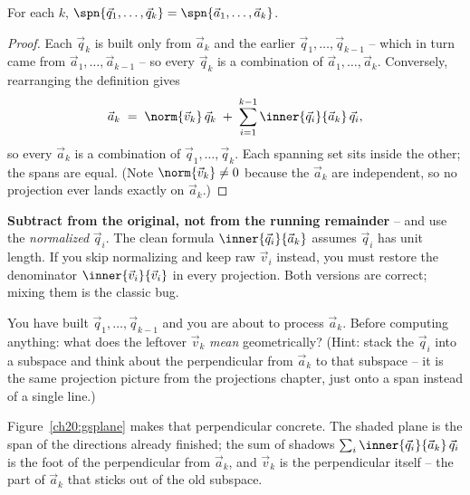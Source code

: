 \begin{proposition}
\label{ch20:span-prop}
For each $k$, $\spn\{\vec{q}_1,\dots,\vec{q}_k\}=\spn\{\vec{a}_1,\dots,\vec{a}_k\}$.
\end{proposition}

\begin{proof}
Each $\vec{q}_k$ is built only from $\vec{a}_k$ and the earlier
$\vec{q}_1,\dots,\vec{q}_{k-1}$ -- which in turn came from $\vec{a}_1,\dots,\vec{a}_{k-1}$
-- so every $\vec{q}_k$ is a combination of $\vec{a}_1,\dots,\vec{a}_k$. Conversely,
rearranging the definition gives
\[
  \vec{a}_k \;=\; \norm{\vec{v}_k}\,\vec{q}_k \;+\; \sum_{i=1}^{k-1}\inner{\vec{q}_i}{\vec{a}_k}\,\vec{q}_i,
\]
so every $\vec{a}_k$ is a combination of $\vec{q}_1,\dots,\vec{q}_k$. Each spanning set
sits inside the other; the spans are equal. (Note $\norm{\vec{v}_k}\neq 0$ because the
$\vec{a}_k$ are independent, so no projection ever lands exactly on $\vec{a}_k$.)
\end{proof}

\begin{trapbox}
\textbf{Subtract from the original, not from the running remainder} -- and use the
\emph{normalized} $\vec{q}_i$. The clean formula $\inner{\vec{q}_i}{\vec{a}_k}$ assumes
$\vec{q}_i$ has unit length. If you skip normalizing and keep raw $\vec{v}_i$ instead,
you must restore the denominator $\inner{\vec{v}_i}{\vec{v}_i}$ in every projection.
Both versions are correct; mixing them is the classic bug.
\end{trapbox}

\begin{walkbox}
You have built $\vec{q}_1,\dots,\vec{q}_{k-1}$ and you are about to process
$\vec{a}_k$. Before computing anything: what does the leftover $\vec{v}_k$ \emph{mean}
geometrically? (Hint: stack the $\vec{q}_i$ into a subspace and think about the
perpendicular from $\vec{a}_k$ to that subspace -- it is the same projection picture
from the projections chapter, just onto a span instead of a single line.)
\end{walkbox}

Figure~\ref{ch20:gsplane} makes that perpendicular concrete. The shaded plane is the
span of the directions already finished; the sum of shadows
$\sum_i \inner{\vec{q}_i}{\vec{a}_k}\,\vec{q}_i$ is the foot of the perpendicular from
$\vec{a}_k$, and $\vec{v}_k$ is the perpendicular itself -- the part of $\vec{a}_k$ that
sticks out of the old subspace.

